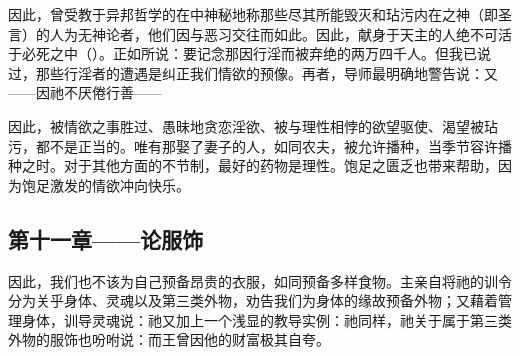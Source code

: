 因此，曾受教于异邦哲学的在中神秘地称那些尽其所能毁灭和玷污内在之神（即圣言）的人为无神论者，他们因与恶习交往而如此。因此，献身于天主的人绝不可活于必死之中（）。正如所说：要记念那因行淫而被弃绝的两万四千人。但我已说过，那些行淫者的遭遇是纠正我们情欲的预像。再者，导师最明确地警告说：又——因祂不厌倦行善——\par

因此，被情欲之事胜过、愚昧地贪恋淫欲、被与理性相悖的欲望驱使、渴望被玷污，都不是正当的。唯有那娶了妻子的人，如同农夫，被允许播种，当季节容许播种之时。对于其他方面的不节制，最好的药物是理性。饱足之匮乏也带来帮助，因为饱足激发的情欲冲向快乐。\par


\subsection{第十一章——论服饰}

因此，我们也不该为自己预备昂贵的衣服，如同预备多样食物。主亲自将祂的训令分为关乎身体、灵魂以及第三类外物，劝告我们为身体的缘故预备外物；又藉着管理身体，训导灵魂说：祂又加上一个浅显的教导实例：祂同样，祂关于属于第三类外物的服饰也吩咐说：而王曾因他的财富极其自夸。\par

